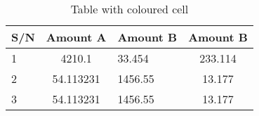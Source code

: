 \documentclass{article}
\begin{document}
	\begin{table}[h!]
		\begin{center}
			\caption{Table with coloured cell}
			\label{tab:table1}
			\begin{tabular}{|l|S|s|c|}
				\hline
				\textbf{S/N} & \textbf{Amount A} & \textbf{Amount B} & \textbf{Amount B}\\
				\hline
				1 & 4210.1 & 33.454 & 233.114\\
				2 & 54.113231 & 1456.55 & 13.177\\
				3 & 54.113231 & 1456.55 & 13.177\\
				\hline
			\end{tabular}
		\end{center}
	\end{table}
\end{document}
